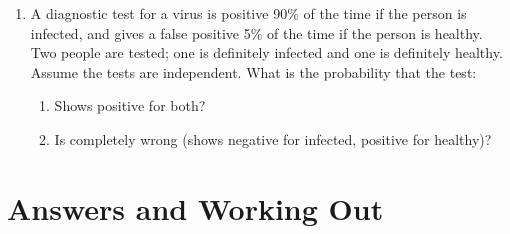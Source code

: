 \documentclass[11pt]{article}
\begin{document}
\begin{enumerate}
\item A diagnostic test for a virus is positive 90\% of the time if the person is infected, and gives a false positive 5\% of the time if the person is healthy. Two people are tested; one is definitely infected and one is definitely healthy. Assume the tests are independent. What is the probability that the test:
\begin{enumerate}
    \item Shows positive for both?
    \item Is completely wrong (shows negative for infected, positive for healthy)?
\end{enumerate}

\end{enumerate}

\newpage
\section*{Answers and Working Out}
\end{document}
